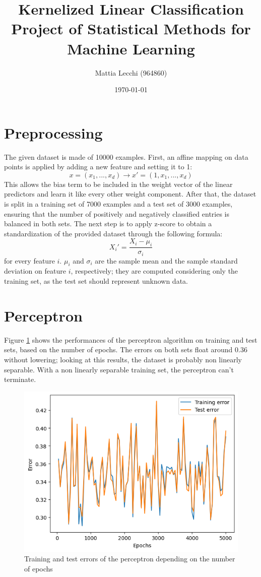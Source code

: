 \documentclass{article}
\author{Mattia Lecchi (964860)}
\date{\today}
\title{Kernelized Linear Classification \\ 
	\large Project of Statistical Methods for Machine Learning}
\begin{document}
\maketitle

\section{Preprocessing}
\label{sec:preprocessing}
The given dataset is made of 10000 examples. First, an affine mapping on data points is applied by adding a new feature and setting it to 1:
\begin{equation}
	x = (x_1, ..., x_d) \rightarrow x'=(1, x_1, ..., x_d)
\end{equation}
This allows the bias term to be included in the weight vector of the linear predictors and learn it like every other weight component. After that, the dataset is split in a training set of 7000 examples and a test set of 3000 examples, ensuring that the number of positively and negatively classified entries is balanced in both sets.
The next step is to apply z-score to obtain a standardization of the provided dataset through the following formula:
\begin{equation}
	X_i' = \frac{X_i - \mu_i}{\sigma_i}
\end{equation}
for every feature $i$. $\mu_i$ and $\sigma_i$ are the sample mean and the sample standard deviation on feature $i$, respectively; they are computed considering only the training set, as the test set should represent unknown data.

\section{Perceptron}

Figure \ref{fig:perceptron} shows the performances of the perceptron algorithm on training and test sets, based on the number of epochs. 
The errors on both sets float around 0.36 without lowering; looking at this results, the dataset is probably non linearly separable. With a non linearly separable training set, the perceptron can't terminate.

\begin{figure}
	\centering
	\includegraphics[width=0.5\columnwidth]{../plots/perceptron.png}
	\caption{Training and test errors of the perceptron depending on the number of epochs}
	\label{fig:perceptron}
\end{figure}
\end{document}
